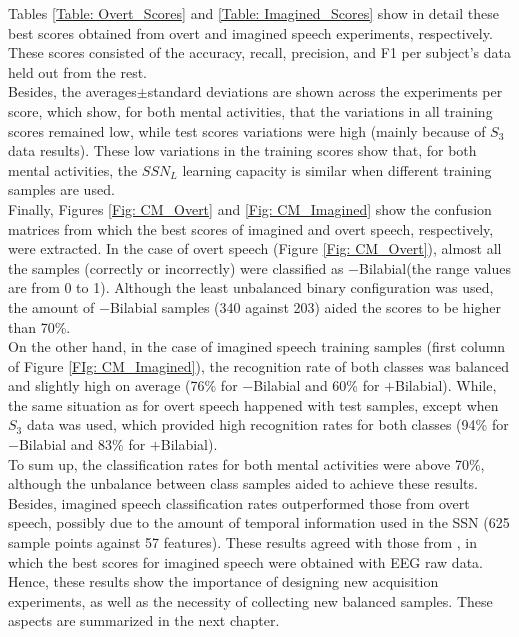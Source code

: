 Tables \ref{Table: Overt_Scores} and \ref{Table: Imagined_Scores} show in detail these best scores obtained from overt and imagined speech experiments, respectively. These scores consisted of the accuracy, recall, precision, and F1 per subject's data held out from the rest.\\

Besides, the averages$\pm$standard deviations are shown across the experiments per score, which show, for both mental activities, that the variations in all training scores remained low, while test scores variations were high (mainly because of $S_{3}$ data results). These low variations in the training scores show that, for both mental activities, the $SSN_{L}$ learning capacity is similar when different training samples are used.\\

Finally, Figures \ref{Fig: CM_Overt} and  \ref{Fig: CM_Imagined} show the confusion matrices from which the best scores of imagined and overt speech, respectively, were extracted. In the case of overt speech (Figure \ref{Fig: CM_Overt}), almost all the samples (correctly or incorrectly) were classified as  $-$Bilabial(the range values are from 0 to 1). Although the least unbalanced binary configuration was used, the amount of $-$Bilabial samples (340 against 203) aided the scores to be higher than 70\%.\\

On the other hand, in the case of imagined speech training samples (first column of Figure \ref{FIg: CM_Imagined}), the recognition rate of both classes was balanced and slightly high on average (76\% for $-$Bilabial and 60\% for  $+$Bilabial). While, the same situation as for overt speech happened with test samples, except when $S_{3}$ data was used, which provided high recognition rates for both classes (94\% for $-$Bilabial and 83\% for  $+$Bilabial).\\

To sum up, the classification rates for both mental activities were above 70\%, although the unbalance between class samples aided to achieve these results. Besides, imagined speech classification rates outperformed those from overt speech, possibly due to the amount of temporal information used in the SSN (625 sample points against 57 features). These results agreed with those from \cite{salinas2017bag}, in which the best scores for imagined speech were obtained with EEG raw data. Hence, these results show the importance of designing new acquisition experiments, as well as the necessity of collecting new balanced samples. These aspects are summarized in the next chapter.

